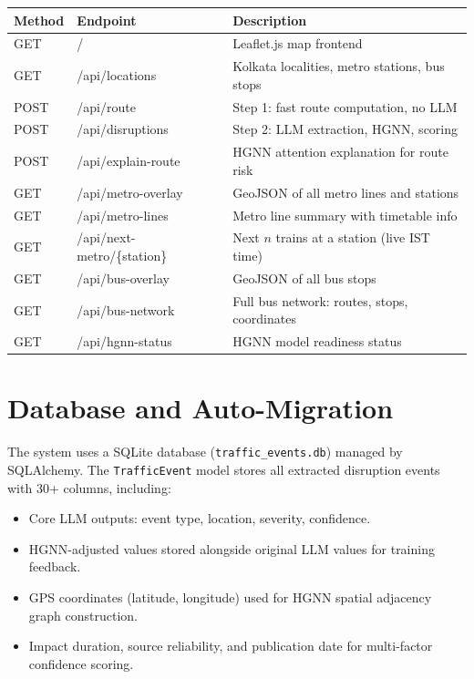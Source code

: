 \documentclass[12pt, a4paper]{report}
\begin{document}
\begin{longtable}{|p{1.5cm}|p{4.5cm}|p{6cm}|}
\hline
\textbf{Method} & \textbf{Endpoint} & \textbf{Description} \\
\hline
GET  & /                             & Leaflet.js map frontend \\
\hline
GET  & /api/locations                & Kolkata localities, metro stations, bus stops \\
\hline
POST & /api/route                    & Step 1: fast route computation, no LLM \\
\hline
POST & /api/disruptions              & Step 2: LLM extraction, HGNN, scoring \\
\hline
POST & /api/explain-route            & HGNN attention explanation for route risk \\
\hline
GET  & /api/metro-overlay            & GeoJSON of all metro lines and stations \\
\hline
GET  & /api/metro-lines              & Metro line summary with timetable info \\
\hline
GET  & /api/next-metro/\{station\}   & Next $n$ trains at a station (live IST time) \\
\hline
GET  & /api/bus-overlay              & GeoJSON of all bus stops \\
\hline
GET  & /api/bus-network              & Full bus network: routes, stops, coordinates \\
\hline
GET  & /api/hgnn-status              & HGNN model readiness status \\
\hline
\end{longtable}

\section{Database and Auto-Migration}

The system uses a SQLite database (\texttt{traffic\_events.db}) managed by SQLAlchemy. The \texttt{TrafficEvent} model stores all extracted disruption events with 30+ columns, including:

\begin{itemize}
    \item Core LLM outputs: event type, location, severity, confidence.
    \item HGNN-adjusted values stored alongside original LLM values for training feedback.
    \item GPS coordinates (latitude, longitude) used for HGNN spatial adjacency graph construction.
    \item Impact duration, source reliability, and publication date for multi-factor confidence scoring.
\end{itemize}
\end{document}
